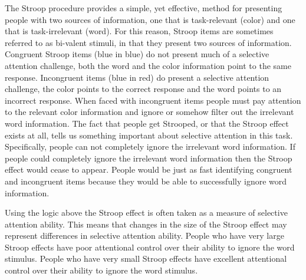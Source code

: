 The Stroop procedure provides a simple, yet effective, method for presenting people with two sources of information, one that is task-relevant (color) and one that is task-irrelevant (word). For this reason, Stroop items are sometimes referred to as bi-valent stimuli, in that they present two sources of information. Congruent Stroop items (blue in blue) do not present much of a selective attention challenge, both the word and the color information point to the same response. Incongruent items (blue in red) do present a selective attention challenge, the color points to the correct response and the word points to an incorrect response. When faced with incongruent items people must pay attention to the relevant color information and ignore or somehow filter out the irrelevant word information. The fact that people get Strooped, or that the Stroop effect exists at all, tells us something important about selective attention in this task. Specifically, people can not completely ignore the irrelevant word information. If people could completely ignore the irrelevant word information then the Stroop effect would cease to appear. People would be just as fast identifying congruent and incongruent items because they would be able to successfully ignore word information. 

Using the logic above the Stroop effect is often taken as a measure of selective attention ability. This means that changes in the size of the Stroop effect may represent differences in selective attention ability. People who have very large Stroop effects have poor attentional control over their ability to ignore the word stimulus. People who have very small Stroop effects have excellent attentional control over their ability to ignore the word stimulus. 




